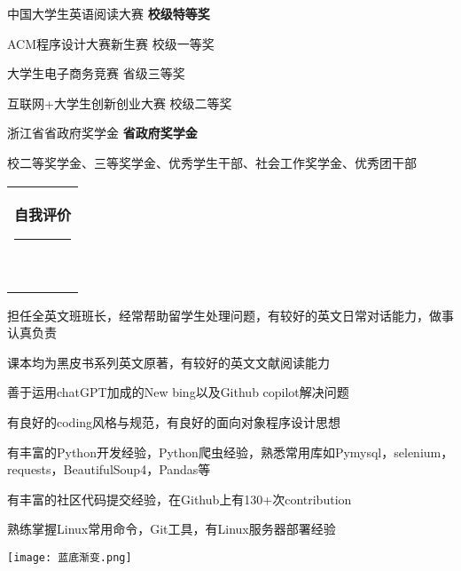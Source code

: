 \documentclass[10pt,A4]{article}
\renewcommand{\CJKglue}{\hskip 1.5pt}
\newcommand{\mpwidth}{\linewidth-\fboxsep-\fboxsep} %
\newcommand{\cvtext}[1] {
	\begin{tabular*}{1\mpwidth}{p{0.98\mpwidth}}
		\parbox{1\mpwidth}{#1}
	\end{tabular*}
}
\newcommand{\mysection}[1] {
	
    \vspace{12pt}

	\cvtext{
        \begingroup
        \renewcommand{\CJKglue}{\hskip 2.5pt}
		\textbf{\LARGE{\textcolor{darkcol}{\uppercase{#1}}}}\\[-4pt]
		\textcolor{maincol}{ \rule{0.1\textwidth}{2pt} } \\[-6pt]
        \endgroup
        }
}
\newcommand{\cvlist}[1] {


	\begin{itemize}
        {#1}
    \end{itemize}

    \vspace{3pt}

    }
\begin{document}
\begin{paracol}{2}
\begin{leftcolumn}
{        \item 中国大学生英语阅读大赛  { \hfill \textbf{校级特等奖} }

        \item ACM程序设计大赛新生赛  { \hfill 校级一等奖 }

        \item 大学生电子商务竞赛  { \hfill 省级三等奖 }

        \item 互联网+大学生创新创业大赛  { \hfill 校级二等奖 }

        \item 浙江省省政府奖学金  { \hfill \textbf{省政府奖学金} }

        \item 校二等奖学金、三等奖学金、优秀学生干部、社会工作奖学金、优秀团干部

        }
        \vspace{-20pt}

        \vfill\null

        \mysection{自我评价}

        \cvlist{
            \item 担任全英文班班长，经常帮助留学生处理问题，有较好的英文日常对话能力，做事认真负责
            \item 课本均为黑皮书系列英文原著，有较好的英文文献阅读能力
            \item 善于运用chatGPT加成的New bing以及Github copilot解决问题
            \item 有良好的coding风格与规范，有良好的面向对象程序设计思想
            \item 有丰富的Python开发经验，Python爬虫经验，熟悉常用库如Pymysql，selenium，requests，BeautifulSoup4，Pandas等
            \item 有丰富的社区代码提交经验，在Github上有130+次contribution
            \item 熟练掌握Linux常用命令，Git工具，有Linux服务器部署经验
        }

        \vfill\null

    \end{leftcolumn}

    \begin{rightcolumn}

        {\begin{center}\texttt{[image: 蓝底渐变.png]}\end{center}}

        \vfill\null


\end{rightcolumn}
\end{paracol}
\end{document}
